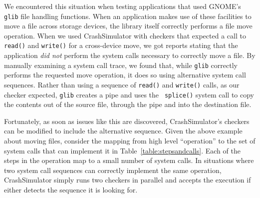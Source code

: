 We encountered this situation when testing applications that used
GNOME's {\tt glib} file handling functions.  When an
application makes use of these facilities to move a file across storage
devices, the library itself correctly performs a
file move operation.  When we used CrashSimulator with
checkers that expected a call to {\tt read()} and {\tt write()}
for a cross-device move, we got reports stating that the
application {\em did not} perform the system calls necessary to
correctly move a file.
By manually
examining a system call trace, we found that, while {\tt glib} correctly
performs the requested move operation,
it does so using alternative system call
sequences.  Rather than using a sequence of {\tt read()} and {\tt write()}
calls, as our checker expected, {\tt glib} creates a pipe and uses the {\tt
splice()} system call to copy the contents out of the source file, through
the pipe and into the destination file.

Fortunately, as soon as issues like this are discovered,
CrashSimulator's checkers can be modified to include the alternative
sequence.
Given the above example about moving
files, consider the mapping from high level ``operation'' to the set of
system calls that can implement it in Table~\ref{table:stepsandcalls}.
Each of the steps in the operation map to a small number of system calls.
In
situations where two system call sequences can correctly implement the same
operation, CrashSimulator simply runs two checkers in parallel
and accepts the execution if either  detects the sequence it is
looking for.

